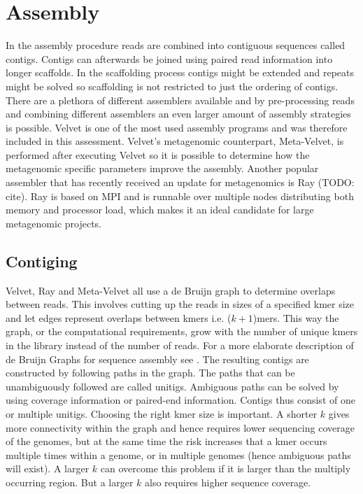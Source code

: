 \documentclass[a4paper,12pt]{report}
\begin{document}
\section{Assembly} In the assembly procedure reads are combined into
contiguous sequences called contigs. Contigs can afterwards be joined using
paired read information into longer scaffolds. In the scaffolding process
contigs might be extended and repeats might be solved so scaffolding is not
restricted to just the ordering of contigs.\\


There are a plethora of different assemblers available and by pre-processing
reads and combining different assemblers an even larger amount of assembly
strategies is possible. Velvet is one of the most used assembly programs and
was therefore included in this assessment. Velvet's metagenomic counterpart,
Meta-Velvet, is performed after executing Velvet so it is possible to determine
how the metagenomic specific parameters improve the assembly. Another popular
assembler that has recently received an update for metagenomics is Ray (TODO:
cite). Ray is based on MPI and is runnable over multiple nodes distributing
both memory and processor load, which makes it an ideal candidate for large
metagenomic projects.\\


\subsection{Contiging}
Velvet, Ray and Meta-Velvet all use a de Bruijn graph to determine overlaps
between reads. This involves cutting up the reads in sizes of a specified kmer
size and let edges represent overlaps between kmers i.e. ($k+1$)mers. This way
the graph, or the computational requirements, grow with the number of unique
kmers in the library instead of the number of reads. For a more elaborate
description of de Bruijn Graphs for sequence assembly see
\cite{Miller20211242}. The resulting contigs are constructed by following paths
in the graph. The paths that can be unambiguously followed are called unitigs.
Ambiguous paths can be solved by using coverage information or paired-end
information. Contigs thus consist of one or multiple unitigs. Choosing the
right kmer size is important. A shorter $k$ gives more connectivity within the
graph and hence requires lower sequencing coverage of the genomes, but at the same
time the risk increases that a kmer occurs multiple times within a genome,
or in multiple genomes (hence ambiguous paths will exist). A larger $k$ can overcome this problem if it is larger
than the multiply occurring region. But a larger $k$ also requires higher
sequence coverage.\\
\end{document}
